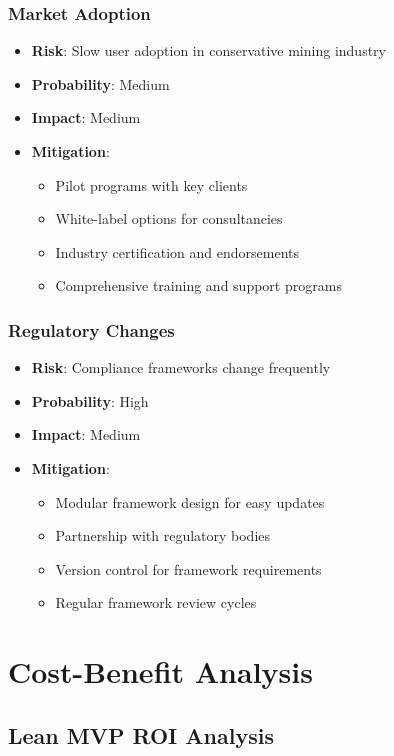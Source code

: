 \documentclass[12pt,a4paper]{report}
\begin{document}
\subsection{Market Adoption}
\begin{itemize}
    \item \textbf{Risk}: Slow user adoption in conservative mining industry
    \item \textbf{Probability}: Medium
    \item \textbf{Impact}: Medium
    \item \textbf{Mitigation}:
    \begin{itemize}
        \item Pilot programs with key clients
        \item White-label options for consultancies
        \item Industry certification and endorsements
        \item Comprehensive training and support programs
    \end{itemize}
\end{itemize}

\subsection{Regulatory Changes}
\begin{itemize}
    \item \textbf{Risk}: Compliance frameworks change frequently
    \item \textbf{Probability}: High
    \item \textbf{Impact}: Medium
    \item \textbf{Mitigation}:
    \begin{itemize}
        \item Modular framework design for easy updates
        \item Partnership with regulatory bodies
        \item Version control for framework requirements
        \item Regular framework review cycles
    \end{itemize}
\end{itemize}

\chapter{Cost-Benefit Analysis}

\section{Lean MVP ROI Analysis}
\end{document}
